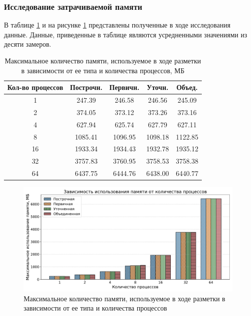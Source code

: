 \subsubsection{Исследование затрачиваемой памяти}

В таблице \ref{tab:pama} и на рисунке \ref{fig:pama} представлены полученные в ходе исследования данные.
Данные, приведенные в таблице являются усредненными значениями из десяти замеров.

\begin{table}[H]
    \centering
    \caption{Максимальное количество памяти, используемое в ходе разметки в зависимости от ее типа и количества процессов, МБ}
    \label{tab:pama}
    \begin{tabular}{|c|c|c|c|c|}
        \hline
        \textbf{Кол-во процессов} & \textbf{Построчн.} & \textbf{Первичн.} & \textbf{Уточн.} & \textbf{Объед.} \\ \hline
        1 & 247.39 & 246.58 & 246.56 & 245.09 \\ \hline
        2 & 374.05 & 373.12 & 373.26 & 373.16 \\ \hline
        4 & 627.94 & 625.74 & 627.79 & 627.11 \\ \hline
        8 & 1085.41 & 1096.95 & 1098.18 & 1122.85 \\ \hline
        16 & 1933.34 & 1934.43 & 1932.78 & 1935.12 \\ \hline
        32 & 3757.83 & 3760.95 & 3758.53 & 3758.38 \\ \hline
        64 & 6437.75 & 6444.76 & 6438.00 & 6440.77 \\ \hline
    \end{tabular}
\end{table}

\begin{figure}[H]
	\centering
	\includegraphics[width=\textwidth]{diag/pama_bar.pdf}
    \caption{Максимальное количество памяти, используемое в ходе разметки в зависимости от ее типа и количества процессов}
	\label{fig:pama}
\end{figure}

